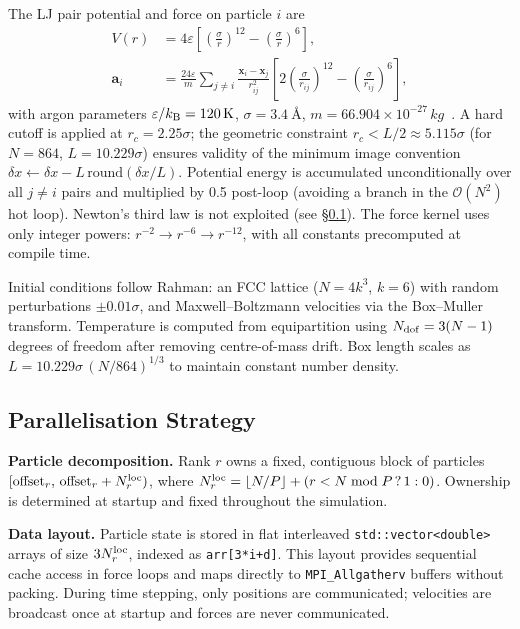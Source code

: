 \documentclass[10pt,twocolumn]{article}
\begin{document}
The LJ pair potential and force on particle $i$ are
\begin{align}
  V(r) &= 4\varepsilon\!\left[\left(\frac{\sigma}{r}\right)^{12}
    - \left(\frac{\sigma}{r}\right)^{6}\right], \label{eq:ljpot}\\
  \mathbf{a}_i &= \frac{24\varepsilon}{m}\sum_{j\ne i}
    \frac{\mathbf{x}_i-\mathbf{x}_j}{r_{ij}^2}
    \!\left[2\!\left(\frac{\sigma}{r_{ij}}\right)^{12}
      - \!\left(\frac{\sigma}{r_{ij}}\right)^6\right], \label{eq:ljforce}
\end{align}
with argon parameters $\varepsilon/k_{\rm B}=\SI{120}{K}$,
$\sigma=\SI{3.4}{\text{\AA}}$, $m=66.904\times10^{-27}\,\si{kg}$~\citep{Rahman1964}.
A hard cutoff is applied at $r_c=2.25\sigma$; the geometric constraint
$r_c < L/2\approx5.115\sigma$ (for $N=864$, $L=10.229\sigma$) ensures validity
of the minimum image convention
$\delta x \leftarrow \delta x - L\,\mathrm{round}(\delta x/L)$.
Potential energy is accumulated unconditionally over all $j\ne i$ pairs and
multiplied by 0.5 post-loop (avoiding a branch in the $\mathcal{O}(N^2)$ hot
loop). Newton's third law is not exploited (see \S\ref{sec:parallel}).
The force kernel uses only integer powers: $r^{-2}\to r^{-6}\to r^{-12}$,
with all constants precomputed at compile time.

Initial conditions follow Rahman: an FCC lattice ($N=4k^3$, $k=6$) with
random perturbations $\pm0.01\sigma$, and Maxwell--Boltzmann velocities
via the Box--Muller transform. Temperature is computed from equipartition
using $N_{\rm dof}=3(N-1)$ degrees of freedom after removing centre-of-mass
drift. Box length scales as $L=10.229\sigma\,(N/864)^{1/3}$ to maintain
constant number density.

\subsection{Parallelisation Strategy}
\label{sec:parallel}

\textbf{Particle decomposition.}
Rank $r$ owns a fixed, contiguous block of particles
$[\mathrm{offset}_r,\,\mathrm{offset}_r+N_r^{\rm loc})$, where
$N_r^{\rm loc}=\lfloor N/P\rfloor+(r<N\bmod P\,?\,1:0)$.
Ownership is determined at startup and fixed throughout the simulation.

\textbf{Data layout.}
Particle state is stored in flat interleaved \texttt{std::vector<double>}
arrays of size $3N_r^{\rm loc}$, indexed as \texttt{arr[3*i+d]}.
This layout provides sequential cache access in force loops and maps directly
to \texttt{MPI\_Allgatherv} buffers without packing.
During time stepping, only positions are communicated; velocities are
broadcast once at startup and forces are never communicated.
\end{document}
